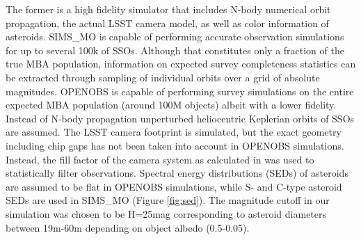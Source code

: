 The former is a high fidelity simulator that includes N-body numerical orbit propagation, the actual \gls{LSST} \gls{camera} model, as well as color information of asteroids. SIMS\_MO is capable of performing accurate observation simulations for up to several 100k of SSOs. Although that constitutes only a fraction of the true \gls{MBA} population, information on expected survey completeness statistics can be extracted through sampling of individual orbits over a grid of absolute magnitudes.
OPENOBS is capable of performing survey simulations on the entire expected \gls{MBA} population (around 100M objects) albeit with a lower fidelity. Instead of N-body propagation unperturbed heliocentric Keplerian orbits of SSOs are assumed. The \gls{LSST} \gls{camera} \gls{footprint} is simulated, but the exact geometry including chip gaps has not been taken into account in OPENOBS simulations. Instead, the fill factor of the \gls{camera} system as calculated in \citet{veres2017high} was used to statistically filter observations. Spectral energy distributions (SEDs) of asteroids are assumed to be flat in OPENOBS simulations, while S- and C-type asteroid \gls{SED}s are used in SIMS\_MO (Figure \ref{fig:sed}). The magnitude cutoff in our simulation was chosen to be H=25mag corresponding to asteroid diameters between 19m-60m depending on object albedo (0.5-0.05).
